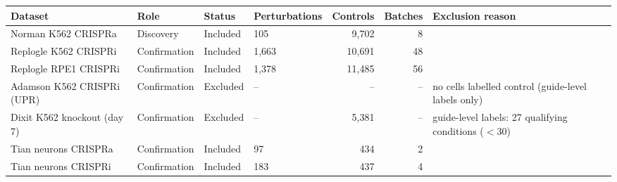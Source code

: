 \begin{tabular}{llllrrp{4.3cm}}
\toprule
Dataset & Role & Status & Perturbations & Controls & Batches & Exclusion reason \\
\midrule
Norman K562 CRISPRa & Discovery & Included & 105 & 9,702 & 8 &  \\
Replogle K562 CRISPRi & Confirmation & Included & 1,663 & 10,691 & 48 &  \\
Replogle RPE1 CRISPRi & Confirmation & Included & 1,378 & 11,485 & 56 &  \\
Adamson K562 CRISPRi (UPR) & Confirmation & Excluded & -- & -- & -- & no cells labelled control (guide-level labels only) \\
Dixit K562 knockout (day 7) & Confirmation & Excluded & -- & 5,381 & -- & guide-level labels: 27 qualifying conditions ($<$30) \\
Tian neurons CRISPRa & Confirmation & Included & 97 & 434 & 2 &  \\
Tian neurons CRISPRi & Confirmation & Included & 183 & 437 & 4 &  \\
\bottomrule
\end{tabular}